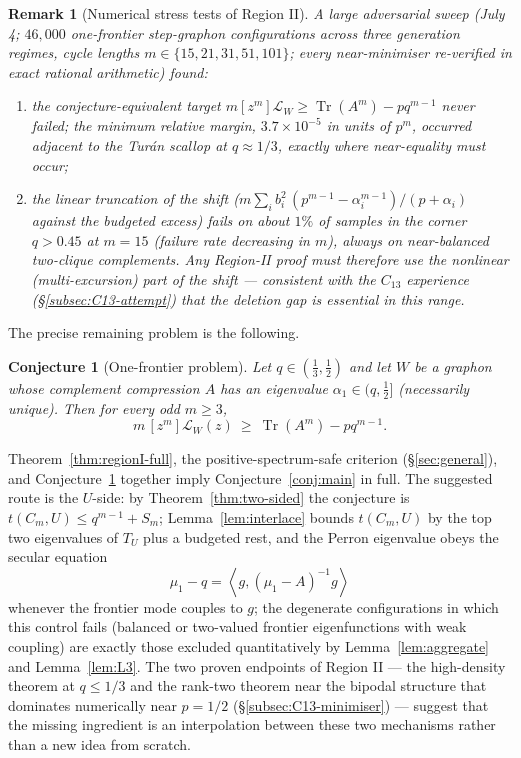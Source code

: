 \documentclass[11pt]{article}
\newtheorem{conjecture}[theorem]{Conjecture}
\newtheorem{remark}[theorem]{Remark}
\newcommand{\ip}[2]{\left\langle #1,#2\right\rangle}
\newcommand{\Tr}{\operatorname{Tr}}
\begin{document}
\begin{remark}[Numerical stress tests of Region II]\label{rmk:region2-numerics}
A large adversarial sweep (July 4; $46{,}000$ one-frontier step-graphon
configurations across three generation regimes, cycle lengths
$m\in\{15,21,31,51,101\}$; every near-minimiser re-verified in exact rational
arithmetic) found:
\begin{enumerate}[label=\textup{(\alph*)}]
\item the conjecture-equivalent target
$m[z^m]\mathcal L_W\ge\Tr(A^m)-pq^{m-1}$ \emph{never} failed; the minimum
relative margin, $3.7\times10^{-5}$ in units of $p^m$, occurred adjacent to
the Tur\'an scallop at $q\approx1/3$, exactly where near-equality must occur;
\item the \emph{linear} truncation of the shift
($m\sum_ib_i^2\,(p^{m-1}-\alpha_i^{m-1})/(p+\alpha_i)$ against the budgeted
excess) fails on about $1\%$ of samples in the corner $q>0.45$ at $m=15$
(failure rate decreasing in $m$), always on near-balanced two-clique
complements.  Any Region-II proof must therefore use the nonlinear
(multi-excursion) part of the shift --- consistent with the $C_{13}$
experience (\S\ref{subsec:C13-attempt}) that the deletion gap is essential in
this range.
\end{enumerate}
\end{remark}

The precise remaining problem is the following.

\begin{conjecture}[One-frontier problem]\label{conj:region2}
Let $q\in(\tfrac13,\tfrac12)$ and let $W$ be a graphon whose complement
compression $A$ has an eigenvalue $\alpha_1\in(q,\tfrac12]$ (necessarily
unique).  Then for every odd $m\ge3$,
\[
        m\,[z^m]\mathcal L_W(z)\ \ge\ \Tr(A^m)-pq^{m-1}.
\]
\end{conjecture}

Theorem~\ref{thm:regionI-full}, the positive-spectrum-safe criterion
(\S\ref{sec:general}), and Conjecture~\ref{conj:region2} together imply
Conjecture~\ref{conj:main} in full.  The suggested route is the $U$-side:
by Theorem~\ref{thm:two-sided} the conjecture is
$t(C_m,U)\le q^{m-1}+S_m$; Lemma~\ref{lem:interlace} bounds $t(C_m,U)$ by the
top two eigenvalues of $T_U$ plus a budgeted rest, and the Perron eigenvalue
obeys the secular equation
\[
        \mu_1-q=\ip{g}{(\mu_1-A)^{-1}g}
\]
whenever the frontier mode couples to $g$; the degenerate configurations in
which this control fails (balanced or two-valued frontier eigenfunctions with
weak coupling) are exactly those excluded quantitatively by
Lemma~\ref{lem:aggregate} and Lemma~\ref{lem:L3}.  The two proven endpoints of
Region II --- the high-density theorem at $q\le1/3$ and the rank-two theorem
near the bipodal structure that dominates numerically near $p=1/2$
(\S\ref{subsec:C13-minimiser}) --- suggest that the missing ingredient is an
interpolation between these two mechanisms rather than a new idea from
scratch.
\end{document}
